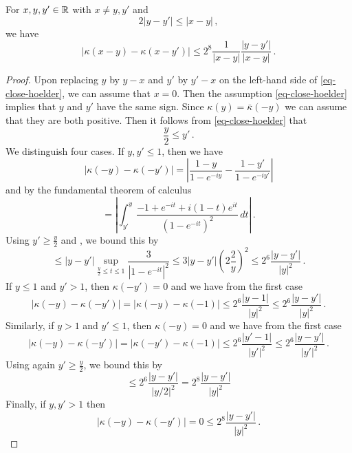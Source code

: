 \begin{lemma}
\label{Hilbert-kernel-regularity}
\leanok
{}
    For $x,y,y'\in {\mathbb{R}}$ with $x\neq y,y'$ and
    \begin{equation}
        \label{eq-close-hoelder}
        2|y-y'|\le |x-y|\, ,
    \end{equation}
    we have
    \begin{equation}\label{eqcarl301}
        |\kappa(x-y) - \kappa(x-y')|\le 2^{8}\frac{1}{|x-y|} \frac{|y-y'|}{|x-y|}\, .
    \end{equation}
\end{lemma}

\begin{proof}
\leanok
    Upon replacing $y$ by $y-x$ and $y'$ by $y'-x$ on the left-hand side of \eqref{eq-close-hoelder}, we can assume that $x = 0$. Then the assumption \eqref{eq-close-hoelder} implies that $y$ and $y'$ have the same sign. Since $\kappa(y) = \bar \kappa(-y)$ we can assume that they are both positive. Then it follows from \eqref{eq-close-hoelder} that
    $$
        \frac{y}{2} \le y' \,.
    $$
    We distinguish four cases. If $y, y' \le 1$, then we have
    $$
        |\kappa(-y) - \kappa(-y')| = \left| \frac{1 - y}{1- e^{-iy}} - \frac{1 - y'}{1- e^{-iy'}}\right|
    $$
    and by the fundamental theorem of calculus
    $$
        = \left| \int_{y'}^{y} \frac{-1 + e^{-it} + i(1-t)e^{it}}{(1 - e^{-it})^2} \,dt \right|\,.
    $$
    Using $y' \ge \frac{y}{2}$ and , we bound this by
    $$
        \le |y - y'| \sup_{\frac{y}{2} \le t \le 1} \frac{3}{|1 - e^{-it}|^2} \le 3 |y-y'| (2 \frac{2}{y})^2 \le 2^{6} \frac{|y-y'|}{|y|^2}\,.
    $$
    If $y \le 1$ and $y' > 1$, then $\kappa(-y') = 0$ and we have from the first case
    $$
        |\kappa(-y) - \kappa(-y')| = |\kappa(-y) - \kappa(-1)| \le 2^{6} \frac{|y-1|}{|y|^2} \le 2^{6} \frac{|y-y'|}{|y|^2}\,.
    $$
    Similarly, if $y > 1$ and $y' \le 1$, then $\kappa(-y) = 0$ and we have from the first case
    $$
        |\kappa(-y) - \kappa(-y')| = |\kappa(-y') - \kappa(-1)| \le 2^{6} \frac{|y'-1|}{|y'|^2} \le 2^{6} \frac{|y-y'|}{|y'|^2}\,.
    $$
    Using again $y' \ge \frac{y}{2}$, we bound this by
    $$
        \le 2^{6} \frac{|y-y'|}{|y / 2|^2} = 2^{8} \frac{|y-y'|}{|y|^2}
    $$
    Finally, if $y, y' > 1$ then
    $$
        |\kappa(-y) - \kappa(-y')| = 0 \le 2^{8} \frac{|y-y'|}{|y|^2}\,.
    $$
\end{proof}






